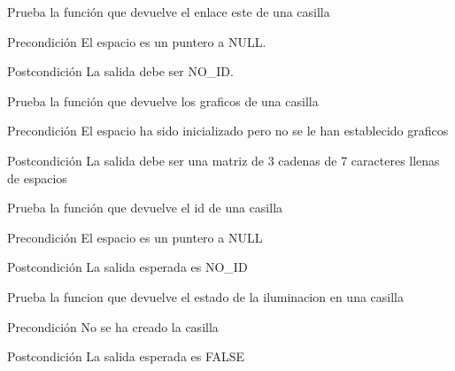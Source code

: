 \begin{DoxyRefList}
\item[\label{test__test000293}%
\hypertarget{test__test000293}{}%
Global \hyperlink{space__test_8c_a249293510e61c6d5465f52c14343d02b}{test2\-\_\-space\-\_\-get\-\_\-east} ()]Prueba la función que devuelve el enlace este de una casilla \begin{DoxyPrecond}{Precondición}
El espacio es un puntero a N\-U\-L\-L. 
\end{DoxyPrecond}
\begin{DoxyPostcond}{Postcondición}
La salida debe ser N\-O\-\_\-\-I\-D.  
\end{DoxyPostcond}

\item[\label{test__test000283}%
\hypertarget{test__test000283}{}%
Global \hyperlink{space__test_8c_a1dc12165942968231572000154761b24}{test2\-\_\-space\-\_\-get\-\_\-graphics} ()]Prueba la función que devuelve los graficos de una casilla \begin{DoxyPrecond}{Precondición}
El espacio ha sido inicializado pero no se le han establecido graficos 
\end{DoxyPrecond}
\begin{DoxyPostcond}{Postcondición}
La salida debe ser una matriz de 3 cadenas de 7 caracteres llenas de espacios  
\end{DoxyPostcond}

\item[\label{test__test000272}%
\hypertarget{test__test000272}{}%
Global \hyperlink{space__test_8c_af9087176b0d3c41d83a17a4918b13e31}{test2\-\_\-space\-\_\-get\-\_\-id} ()]Prueba la función que devuelve el id de una casilla \begin{DoxyPrecond}{Precondición}
El espacio es un puntero a N\-U\-L\-L 
\end{DoxyPrecond}
\begin{DoxyPostcond}{Postcondición}
La salida esperada es N\-O\-\_\-\-I\-D  
\end{DoxyPostcond}

\item[\label{test__test000320}%
\hypertarget{test__test000320}{}%
Global \hyperlink{space__test_8c_ac608a35155a96692d8b353067201fd54}{test2\-\_\-space\-\_\-get\-\_\-iluminated} ()]Prueba la funcion que devuelve el estado de la iluminacion en una casilla \begin{DoxyPrecond}{Precondición}
No se ha creado la casilla 
\end{DoxyPrecond}
\begin{DoxyPostcond}{Postcondición}
La salida esperada es F\-A\-L\-S\-E  
\end{DoxyPostcond}


\end{DoxyRefList}
